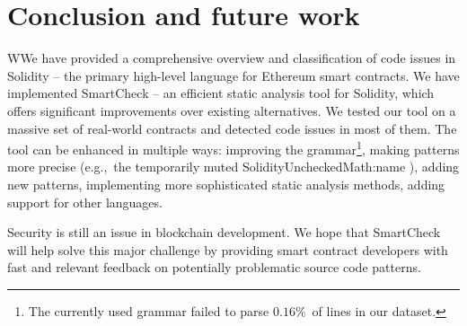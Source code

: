 \section{Conclusion and future work}
	
WWe have provided a comprehensive overview and classification of code issues in Solidity -- the primary high-level language for Ethereum smart contracts.
We have implemented SmartCheck -- an efficient static analysis tool for Solidity, which offers significant improvements over existing alternatives.
We tested our tool on a massive set of real-world contracts and detected code issues in most of them.
The tool can be enhanced in multiple ways: improving the grammar\footnote{The currently used grammar failed to parse $0.16\%$~of lines in our dataset.}, making patterns more precise (e.g.,~the temporarily muted {\usevalue SolidityUncheckedMath:name }), adding new patterns, implementing more sophisticated static analysis methods, adding support for other languages.

Security is still an issue in blockchain development.
We hope that SmartCheck will help solve this major challenge by providing smart contract developers with fast and relevant feedback on potentially problematic source code patterns.